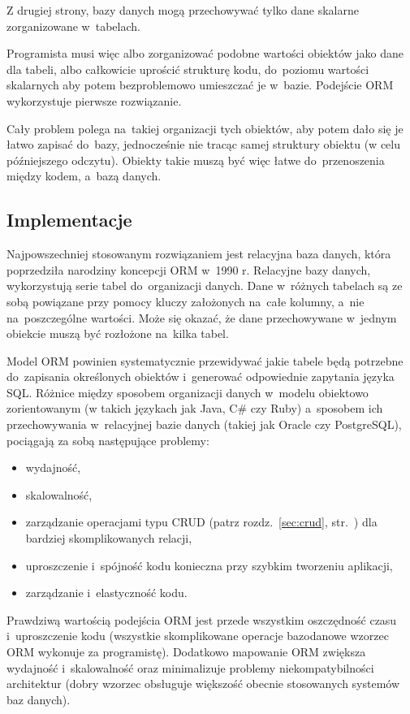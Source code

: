 \documentclass[a4paper,12pt,oneside]{report}
\begin{document}
Z drugiej strony, bazy danych mogą przechowywać tylko dane skalarne zorganizowane w~tabelach.

Programista musi więc albo zorganizować podobne wartości obiektów jako dane dla tabeli, albo całkowicie uprościć strukturę kodu, do~poziomu wartości skalarnych aby potem bezproblemowo umieszczać je w~bazie. Podejście ORM wykorzystuje pierwsze rozwiązanie.

Cały problem polega na~takiej organizacji tych obiektów, aby potem dało się je łatwo zapisać do~bazy, jednocześnie nie tracąc samej struktury obiektu (w celu późniejszego odczytu). Obiekty takie muszą być więc łatwe do~przenoszenia między kodem, a~bazą danych.

\subsection{Implementacje}
\label{subsec:orm-implementacje}
Najpowszechniej stosowanym rozwiązaniem jest relacyjna baza danych, która poprzedziła narodziny koncepcji ORM w~1990 r. Relacyjne bazy danych, wykorzystują serie tabel do~organizacji danych. Dane w~różnych tabelach są ze sobą powiązane przy pomocy kluczy założonych na~całe kolumny, a~nie na~poszczególne wartości. Może się okazać, że dane przechowywane w~jednym obiekcie muszą być rozłożone na~kilka tabel.

Model ORM powinien systematycznie przewidywać jakie tabele będą potrzebne do~zapisania określonych obiektów i~generować odpowiednie zapytania języka SQL. Różnice między sposobem organizacji danych w~modelu obiektowo zorientowanym (w takich językach jak Java, C\# czy Ruby) a~sposobem ich przechowywania w~relacyjnej bazie danych (takiej jak Oracle czy PostgreSQL), pociągają za sobą następujące problemy:
\begin{itemize}
  \item wydajność,
  \item skalowalność,
  \item zarządzanie operacjami typu CRUD (patrz rozdz.~\ref{sec:crud}, str.~\pageref{sec:crud}) dla bardziej skomplikowanych relacji,
  \item uproszczenie i~spójność kodu konieczna przy szybkim tworzeniu aplikacji,
  \item zarządzanie i~elastyczność kodu.
\end{itemize}

Prawdziwą wartością podejścia ORM jest przede wszystkim oszczędność czasu i~uproszczenie kodu (wszystkie skomplikowane operacje bazodanowe wzorzec ORM wykonuje za programistę). Dodatkowo mapowanie ORM zwiększa wydajność i~skalowalność oraz minimalizuje problemy niekompatybilności architektur (dobry wzorzec obsługuje większość obecnie stosowanych systemów baz danych).
\end{document}
